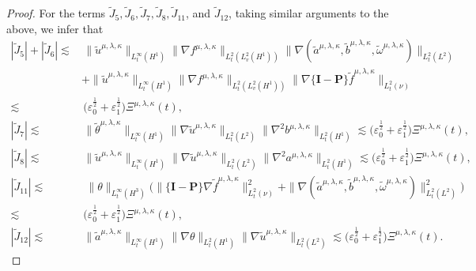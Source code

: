 \documentclass[reqno,11pt]{amsart}
\theoremstyle{plain}
\numberwithin{equation}{section}
\newcommand{\eps}{{\varepsilon}}
\begin{document}
\begin{proof}
For the terms $\widetilde{J}_5,  \widetilde{J}_6, \widetilde{J}_7,  \widetilde{J}_8, \widetilde{J}_{11}$,
and $  \widetilde{J}_{12}$,  taking similar arguments  to the above, we   infer that
\begin{align}
|\widetilde{J}_5 |+|\widetilde{J}_6|
\lesssim&\,\|\widetilde{u}^{\mu,\lambda,\kappa}\|_{L_t^\infty( H^1)}\|\nabla f^{\mu,\lambda,\kappa}\|_{L_t^2(L_v^2(H^1))} \|\nabla(\widetilde{a}^{\mu,\lambda,\kappa},\widetilde{b}^{\mu,\lambda,\kappa},\widetilde{\omega}^{\mu,\lambda,\kappa})\|_{L_t^2(L^2)} \nonumber\\
&+\|\widetilde{u}^{\mu,\lambda,\kappa}\|_{L_t^\infty( H^1)}\|\nabla f^{\mu,\lambda,\kappa}\|_{L_t^2(L_v^2(H^1))} \|\nabla\{\mathbf{I}-\mathbf{P}\}\widetilde{f}^{\mu,\lambda,\kappa}\|_{L_t^2(\nu)} \nonumber\\
\lesssim&\, \big(\eps_0^\frac{1}{2}+\eps_1^\frac{1}{2}\big){\Xi} ^{\mu,\lambda,\kappa}(t),\label{G4.19-1}\\   
|\widetilde{J}_7|\lesssim&\,  \|\widetilde{\theta}^{\mu,\lambda,\kappa}\|_{L_t^\infty(H^1)}\|\nabla\widetilde{u}^{\mu,\lambda,\kappa}\|_{L_t^2(L^2)}\|\nabla^2 b^{\mu,\lambda,\kappa}\|_{L_t^2(H^1)} 
\lesssim  \big(\eps_0^\frac{1}{2}+\eps_1^\frac{1}{2}\big){\Xi} ^{\mu,\lambda,\kappa}(t),\label{G4.19-2}\\
|\widetilde{J}_8|\lesssim&\, \|\widetilde{u}^{\mu,\lambda,\kappa}\|_{L_t^\infty(H^1)}\|\nabla\widetilde{u}^{\mu,\lambda,\kappa}\|_{L_t^2(L^2)}\|\nabla^2 a^{\mu,\lambda,\kappa}\|_{L_t^2(H^1)} 
\lesssim  \big(\eps_0^\frac{1}{2}+\eps_1^\frac{1}{2}\big){\Xi} ^{\mu,\lambda,\kappa}(t),\label{G4.19-3}\\
|\widetilde{J}_{11}|\lesssim&\,\ \|\theta\|_{L_t^\infty(H^3 )}\big(\|\{\mathbf{I}-\mathbf{P}\}\nabla\widetilde{f}^{\mu,\lambda,\kappa}\|_{L_t^2(\nu)}^2 +\|\nabla(\widetilde{a}^{\mu,\lambda,\kappa},\widetilde{b}^{\mu,\lambda,\kappa},\widetilde{\omega}^{\mu,\lambda,\kappa})\|_{L_t^2(L^2)}^2 \big) \nonumber\\ 
\lesssim &\, \big(\eps_0^\frac{1}{2}+\eps_1^\frac{1}{2}\big){\Xi} ^{\mu,\lambda,\kappa}(t),\label{G4.19-4}\\
|\widetilde{J}_{12}| 
\lesssim&\, \|\widetilde{a}^{\mu,\lambda,\kappa}\|_{L_t^\infty(H^1)}\|\nabla \theta \|_{L_t^2(H^1)}\|\nabla\widetilde{u}^{\mu,\lambda,\kappa}\|_{L_t^2(L^2)} 
\lesssim  \big(\eps_0^\frac{1}{2}+\eps_1^\frac{1}{2}\big){\Xi} ^{\mu,\lambda,\kappa}(t).\label{G4.19}
\end{align} 


\end{proof}
\end{document}
